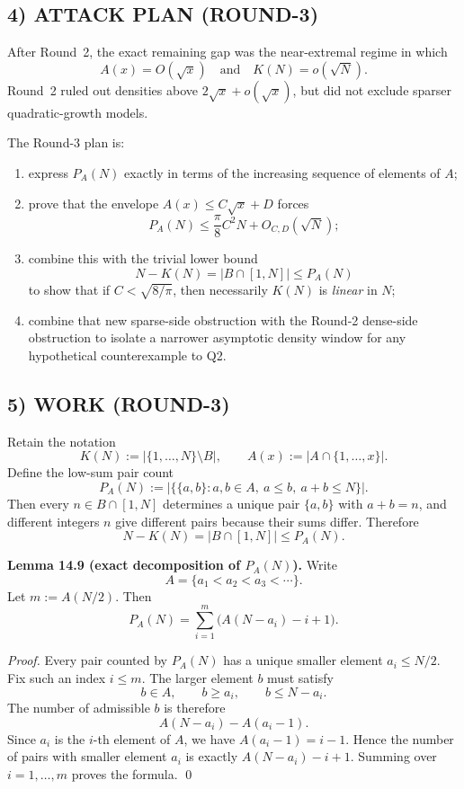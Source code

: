 \subsection*{4) ATTACK PLAN (ROUND-3)}
After Round~2, the exact remaining gap was the near-extremal regime in which
\[
A(x)=O(\sqrt{x})
\quad\mbox{and}\quad
K(N)=o(\sqrt N).
\]
Round~2 ruled out densities above $2\sqrt{x}+o(\sqrt{x})$, but did not exclude sparser quadratic-growth models.

The Round-3 plan is:
\begin{enumerate}
\item express $P_A(N)$ exactly in terms of the increasing sequence of elements of $A$;
\item prove that the envelope $A(x)\le C\sqrt{x}+D$ forces
\[
P_A(N)\le \frac{\pi}{8}C^2N+O_{C,D}(\sqrt N);
\]
\item combine this with the trivial lower bound
\[
N-K(N)=|B\cap[1,N]|\le P_A(N)
\]
to show that if $C<\sqrt{8/\pi}$, then necessarily $K(N)$ is \emph{linear} in $N$;
\item combine that new sparse-side obstruction with the Round-2 dense-side obstruction to isolate a narrower asymptotic density window for any hypothetical counterexample to Q2.
\end{enumerate}

\subsection*{5) WORK (ROUND-3)}
Retain the notation
\[
K(N):=|\{1,\dots,N\}\setminus B|,
\qquad
A(x):=|A\cap\{1,\dots,x\}|.
\]
Define the low-sum pair count
\[
P_A(N):=\bigl|\{\{a,b\}:a,b\in A,\ a\le b,\ a+b\le N\}\bigr|.
\]
Then every $n\in B\cap[1,N]$ determines a unique pair $\{a,b\}$ with $a+b=n$, and different integers $n$ give different pairs because their sums differ. Therefore
\[
N-K(N)=|B\cap[1,N]|\le P_A(N).
\]

\medskip

\noindent\textbf{Lemma 14.9 (exact decomposition of $P_A(N)$).}
Write
\[
A=\{a_1<a_2<a_3<\cdots\}.
\]
Let $m:=A(N/2)$. Then
\[
P_A(N)=\sum_{i=1}^{m}\bigl(A(N-a_i)-i+1\bigr).
\]

\noindent\textit{Proof.}
Every pair counted by $P_A(N)$ has a unique smaller element $a_i\le N/2$. Fix such an index $i\le m$. The larger element $b$ must satisfy
\[
b\in A,
\qquad
b\ge a_i,
\qquad
b\le N-a_i.
\]
The number of admissible $b$ is therefore
\[
A(N-a_i)-A(a_i-1).
\]
Since $a_i$ is the $i$-th element of $A$, we have $A(a_i-1)=i-1$. Hence the number of pairs with smaller element $a_i$ is exactly $A(N-a_i)-i+1$. Summing over $i=1,\dots,m$ proves the formula. \qed

